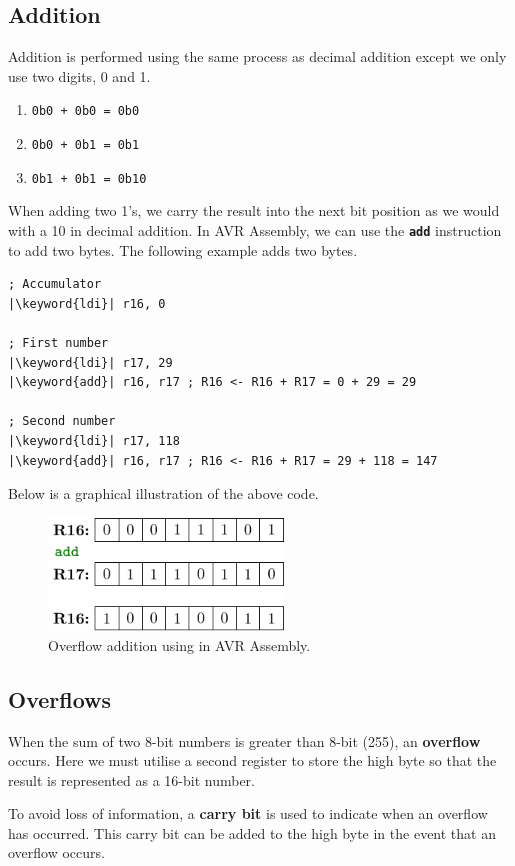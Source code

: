 \documentclass{report}
\newcommand{\keyword}[1]{\textcolor[rgb]{0.00,0.50,0.00}{\textbf{#1}}}
\newcommand{\keywordinline}[1]{\textcolor[rgb]{0.00,0.50,0.00}{\textbf{\texttt{#1}}}}
\begin{document}
\subsection{Addition}
Addition is performed using the same process as decimal addition except we only use two digits, 0 and 1.
\begin{enumerate}
    \item \texttt{0b0 + 0b0 = 0b0}
    \item \texttt{0b0 + 0b1 = 0b1}
    \item \texttt{0b1 + 0b1 = 0b10}
\end{enumerate}
When adding two 1's, we carry the result into the next bit position as we would with a 10 in decimal addition.
In AVR Assembly, we can use the \keywordinline{add} instruction to add two bytes. The following
example adds two bytes.
\begin{verbatim}
; Accumulator
|\keyword{ldi}| r16, 0

; First number
|\keyword{ldi}| r17, 29
|\keyword{add}| r16, r17 ; R16 <- R16 + R17 = 0 + 29 = 29

; Second number
|\keyword{ldi}| r17, 118
|\keyword{add}| r16, r17 ; R16 <- R16 + R17 = 29 + 118 = 147
\end{verbatim}
Below is a graphical illustration of the above code.
\begin{figure}[H]
    \centering
    \includegraphics[height = 3cm, keepaspectratio = true]{figures/add.pdf}
    \caption{Overflow addition using \keyword{} in AVR Assembly.} %
\end{figure}
\subsection{Overflows}
When the sum of two 8-bit numbers is greater than 8-bit (255), an \textbf{overflow} occurs.
Here we must utilise a second register to store the high byte so that the result is represented as
a 16-bit number.

To avoid loss of information, a \textbf{carry bit} is used to indicate when an overflow has occurred.
This carry bit can be added to the high byte in the event that an overflow occurs.
\end{document}

